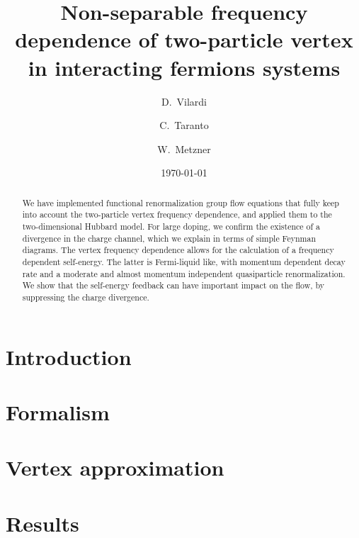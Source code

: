 \documentclass[aps,prb,twocolumn,showpacs,groupedaddress]{revtex4-1}
\begin{document}
\title{Non-separable frequency dependence of two-particle vertex \\ 
        in interacting fermions systems}

\author {D.~Vilardi}
\author{C.~Taranto}
\author{W.~Metzner}

\date{\today}

\begin{abstract}
We have implemented functional renormalization group flow equations that fully keep into account the two-particle vertex frequency dependence, and applied them to the two-dimensional Hubbard model.
For large doping, we confirm the existence of a divergence in the charge channel, 
 which we explain in terms of simple Feynman diagrams. 
The vertex frequency dependence allows for the calculation of a frequency dependent self-energy. The latter is Fermi-liquid like, with momentum dependent decay rate and a moderate and almost momentum independent quasiparticle renormalization.
We show that the self-energy feedback can have important impact on the flow,  by suppressing the charge divergence.
\end{abstract}

\pacs{}
\maketitle

\section{Introduction}
\label{sec:introduction}


\section{Formalism}
\label{sec:formalism}

\section{Vertex approximation}
\label{sec:vertex}


\section{Results}
\label{sec:results}

\end{document}
